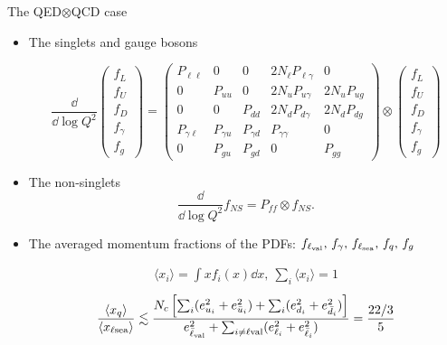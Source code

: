 \documentclass[aspectratio=169]{beamer}
\begin{document}
\begin{frame}{The QED$\otimes$QCD case}
	\begin{itemize}
	\item The singlets and gauge bosons 
	\begin{small}
	\begin{equation}\nonumber
		\frac{\dd}{\dd \log Q^2}
	\begin{pmatrix}
	f_L\\
	f_U\\
	f_D\\
	f_\gamma\\
	f_g
	\end{pmatrix}=
	\begin{pmatrix}
	P_{\ell\ell} & 0 & 0 & 2N_\ell P_{\ell\gamma} & 0\\
	0 & P_{uu} & 0 & 2N_uP_{u\gamma} & 2N_uP_{ug}\\
	0 & 0 & P_{dd} & 2N_dP_{d\gamma} & 2N_dP_{dg}\\
	P_{\gamma\ell} & P_{\gamma u} &  P_{\gamma d} & P_{\gamma\gamma} & 0\\
	0 & P_{g u} & P_{gd} & 0 & P_{gg}
	\end{pmatrix}
	\otimes 
	\begin{pmatrix}
	f_L\\
	f_U\\
	f_D\\
	f_\gamma\\
	f_g
	\end{pmatrix}
	\end{equation}
	\end{small}	
	\item The non-singlets
	\begin{equation}\nonumber
		\frac{\dd}{\dd \log Q^2} f_{NS}=P_{ff}\otimes f_{NS}.
	\end{equation}
	\item The averaged momentum fractions of the PDFs: $f_{\ell_{\rm val}},\, f_\gamma,\, f_{\ell_{\rm sea}},\, f_q,\, f_g$
	\begin{small}
	\begin{eqnarray}
		\langle x_i\rangle=\int xf_i(x)\dd x,~\sum_i \langle x_i\rangle=1 \nonumber
	\end{eqnarray}
	\vspace{-3mm}
	\begin{eqnarray}
		\frac{\langle x_q\rangle}{\langle x_{\ell{\textrm{sea}}}\rangle}\lesssim \frac{N_c\left[\sum_i(e_{u_i}^2+e_{\bar{u}_i}^2)+\sum_{i}(e_{d_i}^2+e_{\bar{d}_i}^2)\right]}{e^2_{{\bar \ell}_{\rm val}}+\sum_{i\neq\ell{\textrm{val}}}(e_{\ell_i}^2+e_{\bar{\ell}_i}^2)}=\frac{22/3}{5}\nonumber
	\end{eqnarray}
	\end{small}
	\end{itemize}
\end{frame}
\end{document}
